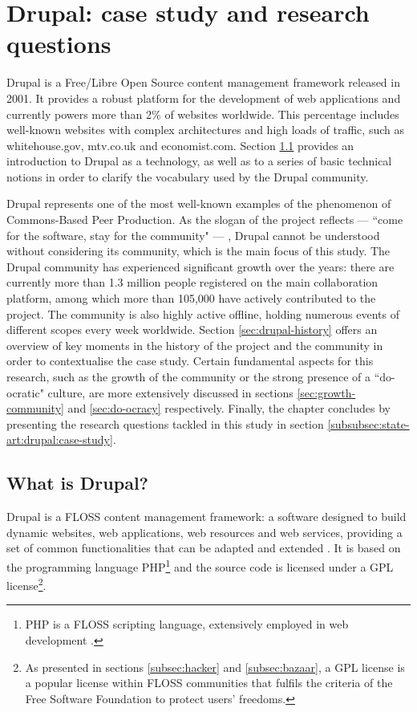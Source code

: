 \chapter{Drupal: case study and research questions}
\label{chapter:case-study}

Drupal is a Free/Libre Open Source content management framework released in 2001. It provides a robust platform for the development of web applications and currently powers more than 2\% of websites worldwide. This percentage includes well-known websites with complex architectures and high loads of traffic, such as whitehouse.gov, mtv.co.uk and economist.com. Section \ref{sec:what-is-drupal} provides an introduction to Drupal as a technology, as well as to a series of basic technical notions in order to clarify the vocabulary used by the Drupal community.

Drupal represents one of the most well-known examples of the phenomenon of Commons-Based Peer Production. As the slogan of the project reflects --- ``come for the software, stay for the community" --- , Drupal cannot be understood without considering its community, which is the main focus of this study. The Drupal community has experienced significant growth over the years: there are currently more than 1.3 million people registered on the main collaboration platform, among which more than 105,000 have actively contributed to the project. The community is also highly active offline, holding numerous events of different scopes every week worldwide. Section \ref{sec:drupal-history} offers an overview of key moments in the history of the project and the community in order to contextualise the case study. Certain fundamental aspects for this research, such as the growth of the community or the strong presence of a ``do-ocratic" culture, are more extensively discussed in sections \ref{sec:growth-community} and \ref{sec:do-ocracy} respectively. Finally, the chapter concludes by presenting the research questions tackled in this study in section \ref{subsubsec:state-art:drupal:case-study}.

\section{What is Drupal?}
\label{sec:what-is-drupal}

Drupal is a FLOSS content management framework: a software designed to build dynamic websites, web applications, web resources and web services, providing a set of common functionalities that can be adapted and extended \parencite{drupal-wap:2014:Online}. It is based on the programming language PHP\footnote{PHP is a FLOSS scripting language, extensively employed in web development \parencite{php:2017:Online}.} and the source code is licensed under a GPL license\footnote{\label{fn-gpl} As presented in sections \ref{subsec:hacker} and \ref{subsec:bazaar}, a GPL license is a popular license within FLOSS communities that fulfils the criteria of the Free Software Foundation to protect users' freedoms.}.

